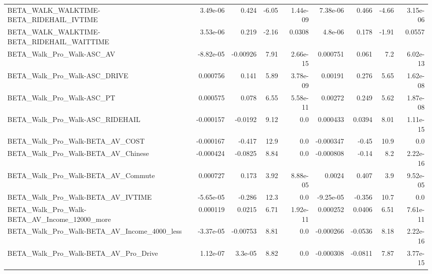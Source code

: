 \begin{tabular}{lrrrrrrrr}
BETA\_WALK\_WALKTIME-BETA\_RIDEHAIL\_IVTIME            &    3.49e-06 &        0.424 &     -6.05 & 1.44e-09 &   7.38e-06 &       0.466 &        -4.66 &      3.15e-06 \\
BETA\_WALK\_WALKTIME-BETA\_RIDEHAIL\_WAITTIME          &    3.53e-06 &        0.219 &     -2.16 &   0.0308 &    4.8e-06 &       0.178 &        -1.91 &        0.0557 \\
BETA\_Walk\_Pro\_Walk-ASC\_AV                          &   -8.82e-05 &     -0.00926 &      7.91 & 2.66e-15 &   0.000751 &       0.061 &          7.2 &      6.02e-13 \\
BETA\_Walk\_Pro\_Walk-ASC\_DRIVE                       &    0.000756 &        0.141 &      5.89 & 3.78e-09 &    0.00191 &       0.276 &         5.65 &      1.62e-08 \\
BETA\_Walk\_Pro\_Walk-ASC\_PT                          &    0.000575 &        0.078 &      6.55 & 5.58e-11 &    0.00272 &       0.249 &         5.62 &      1.87e-08 \\
BETA\_Walk\_Pro\_Walk-ASC\_RIDEHAIL                    &   -0.000157 &      -0.0192 &      9.12 &      0.0 &   0.000433 &      0.0394 &         8.01 &      1.11e-15 \\
BETA\_Walk\_Pro\_Walk-BETA\_AV\_COST                    &   -0.000167 &       -0.417 &      12.9 &      0.0 &  -0.000347 &       -0.45 &         10.9 &           0.0 \\
BETA\_Walk\_Pro\_Walk-BETA\_AV\_Chinese                 &   -0.000424 &      -0.0825 &      8.84 &      0.0 &  -0.000808 &       -0.14 &          8.2 &      2.22e-16 \\
BETA\_Walk\_Pro\_Walk-BETA\_AV\_Commute                 &    0.000727 &        0.173 &      3.92 & 8.88e-05 &     0.0024 &       0.407 &          3.9 &      9.52e-05 \\
BETA\_Walk\_Pro\_Walk-BETA\_AV\_IVTIME                  &   -5.65e-05 &       -0.286 &      12.3 &      0.0 &  -9.25e-05 &      -0.356 &         10.7 &           0.0 \\
BETA\_Walk\_Pro\_Walk-BETA\_AV\_Income\_12000\_more       &    0.000119 &       0.0215 &      6.71 & 1.92e-11 &   0.000252 &      0.0406 &         6.51 &      7.61e-11 \\
BETA\_Walk\_Pro\_Walk-BETA\_AV\_Income\_4000\_less        &   -3.37e-05 &     -0.00753 &      8.81 &      0.0 &  -0.000266 &     -0.0536 &         8.18 &      2.22e-16 \\
BETA\_Walk\_Pro\_Walk-BETA\_AV\_Pro\_Drive               &    1.12e-07 &      3.3e-05 &      8.82 &      0.0 &  -0.000308 &     -0.0811 &         7.87 &      3.77e-15 \\

\end{tabular}
